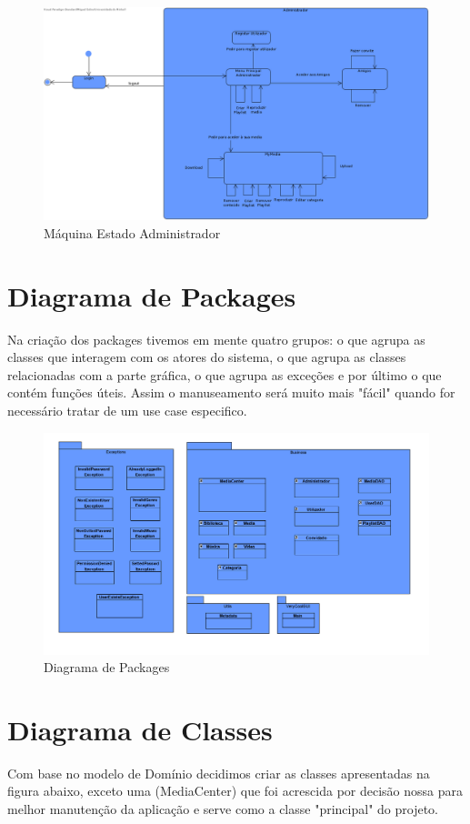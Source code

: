 \documentclass[a4paper]{report}
\begin{document}
\begin{figure}[H]
	\centering 
    \includegraphics[width=\textwidth]{images/maqAdmin.png}  
    \caption{Máquina Estado Administrador}
\end{figure}

\chapter{Diagrama de Packages}
Na criação dos packages tivemos em mente quatro grupos: o que agrupa as classes que 
interagem com os atores do sistema, o que agrupa as classes relacionadas com a
parte gráfica, o que agrupa as exceções e por último o que contém funções úteis.
Assim o manuseamento será muito mais "fácil" quando for necessário tratar de um use case
especifico.

\begin{figure}[H]
	\centering 
    \includegraphics[width=\textwidth]{images/packages.png}  
    \caption{Diagrama de Packages}
\end{figure}

\chapter{Diagrama de Classes}
Com base no modelo de Domínio decidimos criar as classes apresentadas na figura abaixo,
exceto uma (MediaCenter) que foi acrescida por decisão nossa para melhor manutenção
da aplicação e serve como a classe "principal" do projeto.
\end{document}
